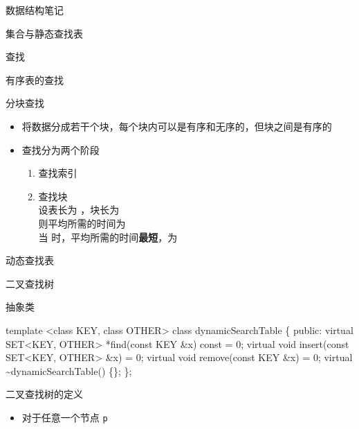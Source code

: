 \documentclass[
  ignorenonframetext,
]{beamer}
\newenvironment{Shaded}{}{}
\newcommand{\NormalTok}[1]{#1}
\providecommand{\tightlist}{%
  \setlength{\itemsep}{0pt}\setlength{\parskip}{0pt}}
\begin{document}
\begin{frame}[fragile]{数据结构笔记}
\begin{block}{集合与静态查找表}
\begin{block}{查找}
\begin{block}{有序表的查找}
\begin{block}{分块查找}
\protect{}\label{ux5206ux5757ux67e5ux627e}
\begin{itemize}
\tightlist
\item
  将数据分成若干个块，每个块内可以是有序和无序的，但块之间是有序的
\item
  查找分为两个阶段

  \begin{enumerate}
  \tightlist
  \item
    查找索引
  \item
    查找块\\
    设表长为 {}，块长为 {}\\
    则平均所需的时间为 {}\\
    当 {} 时，平均所需的时间\textbf{最短}，为 {}
  \end{enumerate}
\end{itemize}
\end{block}
\end{block}
\end{block}
\end{block}

\begin{block}{动态查找表}
\protect{}\label{ux52a8ux6001ux67e5ux627eux8868}
\begin{block}{二叉查找树}
\protect{}\label{ux4e8cux53c9ux67e5ux627eux6811}
\begin{block}{抽象类}
\protect{}\label{ux62bdux8c61ux7c7b-1}
\begin{Shaded}
\begin{Highlighting}[]
\NormalTok{template \textless{}class KEY, class OTHER\textgreater{}}
\NormalTok{class dynamicSearchTable}
\NormalTok{\{}
\NormalTok{  public:}
\NormalTok{    virtual SET\textless{}KEY, OTHER\textgreater{} *find(const KEY \&x) const = 0;}
\NormalTok{    virtual void insert(const SET\textless{}KEY, OTHER\textgreater{} \&x) = 0;}
\NormalTok{    virtual void remove(const KEY \&x) = 0;}
\NormalTok{    virtual \textasciitilde{}dynamicSearchTable() \{\};}
\NormalTok{\};}
\end{Highlighting}
\end{Shaded}
\end{block}

\begin{block}{二叉查找树的定义}
\protect{}\label{ux4e8cux53c9ux67e5ux627eux6811ux7684ux5b9aux4e49}
\begin{itemize}
\tightlist
\item
  对于任意一个节点 \texttt{p}


\end{itemize}
\end{block}
\end{block}
\end{block}
\end{frame}
\end{document}
